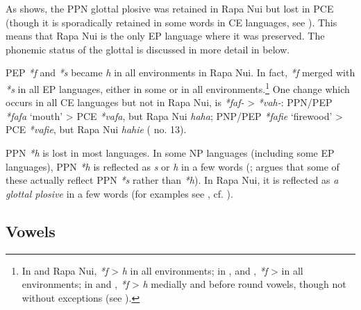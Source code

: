 
As  shows, the PPN glottal plosive was retained in Rapa Nui but lost in PCE (though it is sporadically retained in some words in CE languages, see \citealt[335]{Wilson2012}). This means that Rapa Nui is the only EP language where it was preserved. The phonemic status of the glottal is discussed in more detail in  below. 

PEP \textit{*f} and \textit{*s} became \textit{h} in all environments in Rapa Nui. In fact, \textit{*f} merged with \textit{*s} in all EP languages, either in some or in all environments.\footnote{\label{fn:33}In  and Rapa Nui, \textit{*}\textit{f} > \textit{h} in all environments; in ,  and , \textit{*f} > \textit{{\ꞌ}} in all environments; in  and , \textit{*f} > \textit{h} medially and before round vowels, though not without exceptions (see \citealt{Harlow1998}).} One change which occurs in all CE languages but not in Rapa Nui, is \textit{*faf-} > \textit{*vah-}: PPN/PEP \textit{*fafa} ‘mouth’ > PCE \textit{*vafa}, but Rapa Nui \textit{haha}; PNP/PEP \textit{*fafie} ‘firewood’ > PCE \textit{*vafie}, but Rapa Nui \textit{hahie} ( no. 13).

PPN \textit{*h} is lost in most languages. In some NP languages (including some EP languages), PPN \textit{*h} is reflected as \textit{s} or \textit{h} in a few words (\citealt{Marck2000}; \citealt{Rutter2001} argues that some of these actually reflect PPN \textit{*s} rather than \textit{*h}). In Rapa Nui, it is reflected as \textit{\textup{a glottal plosive}} in a few words (for examples see , cf. \citealt{Davletshin2015}). 

\subsection{Vowels}\label{sec:2.2.2}

